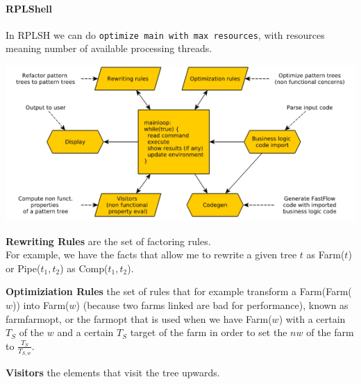 \documentclass[10pt]{report}
\begin{document}
\paragraph{RPLShell}
In RPLSH we can do \texttt{optimize main with max resources}, with resources meaning number of available processing threads.
\begin{center}
	\includegraphics[scale=0.5]{13.png}
\end{center}
\begin{list}{}{}
	\item \textbf{Rewriting Rules} are the set of factoring rules.\\
	For example, we have the facts that allow me to rewrite a given tree $t$ as Farm($t$) or Pipe($t_1,t_2$) as Comp($t_1,t_2$).
	\item \textbf{Optimiziation Rules} the set of rules that for example transform a Farm(Farm($w$)) into Farm($w$) (because two farms linked are bad for performance), known as farmfarmopt, or the farmopt that is used when we have Farm($w$) with a certain $T_S$ of the $w$ and a certain $T_S$ target of the farm in order to set the $nw$ of the farm to $\frac{T_S}{T_{S,w}}$.
	\item \textbf{Visitors} the elements that visit the tree upwards.
\end{list}
\end{document}
